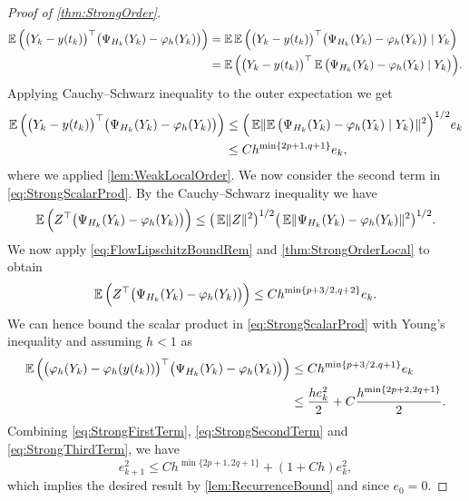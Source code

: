 \documentclass[10pt]{article}
\begin{document}
\begin{proof}[Proof of \cref{thm:StrongOrder}]
\begin{equation}
\begin{aligned}
		\operatorname{\mathbb{E}}\Big(\big(Y_k - y(t_k)\big)^\top \big(\Psi_{H_k}(Y_k) - \varphi_{h}(Y_k)\big)\Big) &= \operatorname{\mathbb{E}}\operatorname{\mathbb{E}}\Big(\big(Y_k - y(t_k)\big)^\top \big(\Psi_{H_k}(Y_k) - \varphi_{h}(Y_k)\big) \mid Y_k\Big)\\
		&= \operatorname{\mathbb{E}}\Big(\big(Y_k - y(t_k)\big)^\top\operatorname{\mathbb{E}} \big(\Psi_{H_k}(Y_k) - \varphi_{h}(Y_k) \mid Y_k \big)\Big).
	\end{aligned}
	\end{equation}
	Applying Cauchy--Schwarz inequality to the outer expectation we get
	\begin{equation}
	\begin{aligned}
		\operatorname{\mathbb{E}}\Big(\big(Y_k - y(t_k)\big)^\top \big(\Psi_{H_k}(Y_k) - \varphi_{h}(Y_k)\big)\Big) &\leq \Big(\operatorname{\mathbb{E}}\lVert\operatorname{\mathbb{E}}\big(\Psi_{H_k}(Y_k) - \varphi_{h}(Y_k) \mid Y_k\big)\rVert^{2}\Big)^{1/2}e_k  \\
		&\leq  Ch^{\min\{2p+1, q+1\}}e_k,
	\end{aligned}
	\end{equation}
	where we applied \cref{lem:WeakLocalOrder}. We now consider the second term in \eqref{eq:StrongScalarProd}. By the Cauchy--Schwarz inequality we have
	\begin{equation}
		\operatorname{\mathbb{E}}\Big(Z^\top \big(\Psi_{H_k}(Y_k) - \varphi_{h}(Y_k)\big)\Big) \leq \big(\operatorname{\mathbb{E}}\lVert Z\rVert^{2}\big)^{1/2} \big(\operatorname{\mathbb{E}}\lVert\Psi_{H_k}(Y_k) - \varphi_{h}(Y_k)\rVert^2\big)^{1/2}.
	\end{equation}
	We now apply \eqref{eq:FlowLipschitzBoundRem} and \cref{thm:StrongOrderLocal} to obtain
	\begin{equation}
		\operatorname{\mathbb{E}}\Big(Z^\top \big(\Psi_{H_k}(Y_k) - \varphi_{h}(Y_k)\big)\Big) \leq C h^{\min\{p+3/2, q+2\}} e_k.
	\end{equation}
	We can hence bound the scalar product in \eqref{eq:StrongScalarProd} with Young's inequality and assuming $h < 1$ as
	\begin{equation}\label{eq:StrongThirdTerm}
	\begin{aligned}
		\operatorname{\mathbb{E}}\Big(\big(\varphi_{h}(Y_k) - \varphi_{h}(y(t_k))\big)^\top\big(\Psi_{H_k}(Y_k) - \varphi_{h}(Y_k)\big)\Big) &\leq C h^{\min\{p+3/2, q+1\}} e_k \\
		&\leq \frac{he_k^2}{2} + C\frac{h^{\min\{2p+2,2q+1\}}}{2}.
	\end{aligned}
	\end{equation}
	Combining \eqref{eq:StrongFirstTerm}, \eqref{eq:StrongSecondTerm} and \eqref{eq:StrongThirdTerm}, we have
	\begin{equation}
		e_{k+1}^2 \leq Ch^{\min\{2p+1, 2q+1\}} + (1 + Ch)e_k^2,
	\end{equation}
	which implies the desired result by \cref{lem:RecurrenceBound} and since $e_0 = 0$.
\end{proof}
\end{document}
